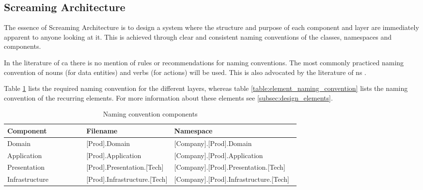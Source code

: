 \subsection{Screaming Architecture}
The essence of Screaming Architecture is to design a system where the structure and
purpose of each component and layer are immediately apparent to anyone looking at it. This
is achieved through clear and consistent naming conventions of the classes, namespaces and
components.

In the literature of \gls{ca} there is no mention of rules or recommendations for naming
conventions. The most commonly practiced naming convention of nouns (for data entities)
and verbs (for actions) will be used. This is also advocated by the literature of \gls{ns}
\parencite[357]{mannaert_normalized_2016}.

Table \ref{table:component_naming_convention} lists the required naming convention for the
different layers, whereas table \ref{table:element_naming_convention} lists the naming
convention of the recurring elements. For more information about these elements see
\ref{subsec:design_elements}.

\begin{table}[h]
    \small
    \begin{tabular}{ l p{0.30\linewidth} p{0.43\linewidth} }
    \hline
    \textbf{Component} & \textbf{Filename} & \textbf{Namespace} \\ 
    \hline
    Domain & [Prod].Domain & [Company].[Prod].Domain \\
    Application & [Prod].Application & [Company].[Prod].Application \\
    Presentation & [Prod].Presentation.[Tech] & [Company].[Prod].Presentation.[Tech] \\
    Infrastructure & [Prod].Infrastructure.[Tech] & [Company].[Prod].Infrastructure.[Tech]
    \\ \hline
    \end{tabular}
\caption{Naming convention components}
\label{table:component_naming_convention}
\end{table}

